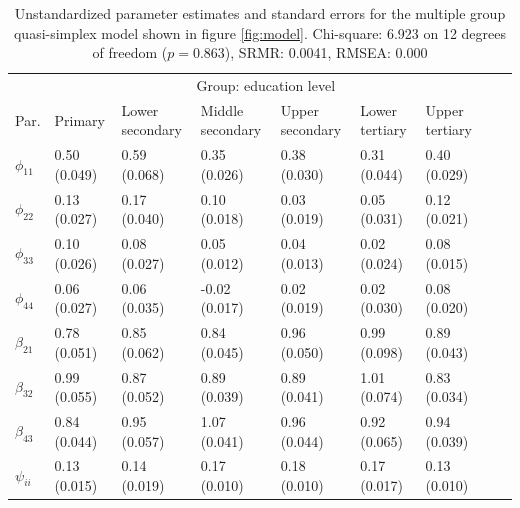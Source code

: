\documentclass[a4paper,11pt]{article}
\newcommand{\0}{\boldsymbol{0}}
\begin{document}
\begin{table}\begin{small}
\begin{tabularx}{\textwidth}{l*{8}{X}}
  \hline  \hline
  	& \multicolumn{6}{c}{Group: education level}\\	\cline{2-7}
    Par.  &       Primary         & Lower secondary & Middle secondary & Upper secondary & Lower tertiary & Upper tertiary\\
  \hline
$\phi_{11}$   & 0.50 (0.049) & 0.59 (0.068) & 0.35 (0.026) & 0.38 (0.030) & 0.31 (0.044) & 0.40 (0.029) \\ 
$\phi_{22}$   & 0.13 (0.027) & 0.17 (0.040) & 0.10 (0.018) & 0.03 (0.019) & 0.05 (0.031) & 0.12 (0.021) \\ 
$\phi_{33}$   & 0.10 (0.026) & 0.08 (0.027) & 0.05 (0.012) & 0.04 (0.013) & 0.02 (0.024) & 0.08 (0.015) \\ 
$\phi_{44}$   & 0.06 (0.027) & 0.06 (0.035) & -0.02 (0.017) & 0.02 (0.019) & 0.02 (0.030) & 0.08 (0.020) \\ 
$\beta_{21}$  & 0.78 (0.051) & 0.85 (0.062) & 0.84 (0.045) & 0.96 (0.050) & 0.99 (0.098) & 0.89 (0.043) \\ 
$\beta_{32}$  & 0.99 (0.055) & 0.87 (0.052) & 0.89 (0.039) & 0.89 (0.041) & 1.01 (0.074) & 0.83 (0.034) \\ 
$\beta_{43}$  & 0.84 (0.044) & 0.95 (0.057) & 1.07 (0.041) & 0.96 (0.044) & 0.92 (0.065) & 0.94 (0.039) \\ 
$\psi_{ii}$   & 0.13 (0.015) & 0.14 (0.019) & 0.17 (0.010) & 0.18 (0.010) & 0.17 (0.017) & 0.13 (0.010) \\ 
     \hline  \hline
\end{tabularx}\caption{Unstandardized parameter estimates and standard errors for the 
multiple group quasi-simplex model shown in figure \ref{fig:model}.
Chi-square:  6.923 on  12 degrees of freedom  ($p = 0.863$),  SRMR:  0.0041, RMSEA: 0.000}
\label{tab:results-unstandardized}
\end{small}\end{table}
\end{document}
